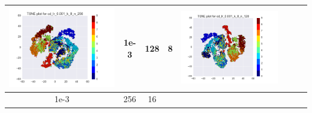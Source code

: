 \documentclass[12pt]{report}
\begin{document}
\begin{table}[H]
\begin{tabular}{ | c | c | c | c || c | c | c| c |}
\begin{minipage}{.3\textwidth}
      \includegraphics[scale=0.25]{cd_lr_0_001_k_8_n_256.png}
    \end{minipage}
     & 1e-3 & 128 & 8 &
    \begin{minipage}{.3\textwidth}
      \includegraphics[scale=0.25]{cd_lr_0_001_k_8_n_128.png}
    \end{minipage}
    \\ \hline
        1e-3 & 256 & 16 &
    \begin{minipage}{.3\textwidth}

\end{minipage}
\end{tabular}
\end{table}
\end{document}
